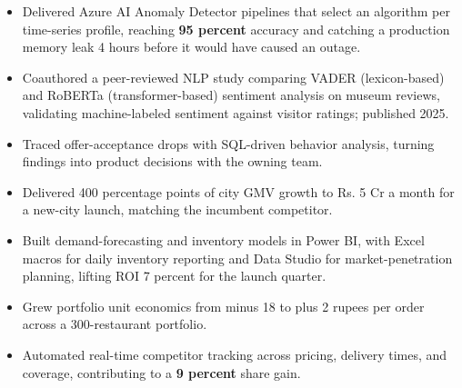 \documentclass[letterpaper,10pt]{article}
\begin{document}
\begin{itemize}
\item Delivered Azure AI Anomaly Detector pipelines that select an algorithm per time-series profile, reaching \textbf{95 percent} accuracy and catching a production memory leak 4 hours before it would have caused an outage.
\item Coauthored a peer-reviewed NLP study comparing VADER (lexicon-based) and RoBERTa (transformer-based) sentiment analysis on museum reviews, validating machine-labeled sentiment against visitor ratings; published 2025.
\end{itemize}

\begin{itemize}
\item Traced offer-acceptance drops with SQL-driven behavior analysis, turning findings into product decisions with the owning team.
\end{itemize}

\begin{itemize}
\item Delivered 400 percentage points of city GMV growth to Rs. 5 Cr a month for a new-city launch, matching the incumbent competitor.
\item Built demand-forecasting and inventory models in Power BI, with Excel macros for daily inventory reporting and Data Studio for market-penetration planning, lifting ROI 7 percent for the launch quarter.
\end{itemize}

\begin{itemize}
\item Grew portfolio unit economics from minus 18 to plus 2 rupees per order across a 300-restaurant portfolio.
\item Automated real-time competitor tracking across pricing, delivery times, and coverage, contributing to a \textbf{9 percent} share gain.
\end{itemize}
\end{document}

